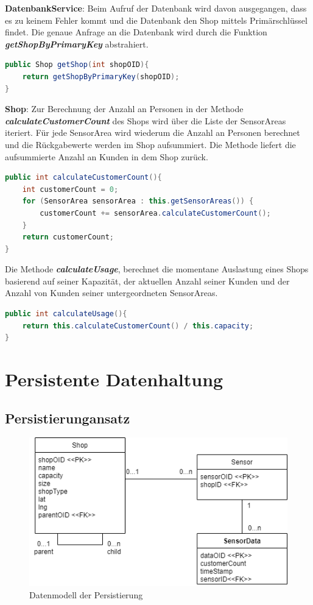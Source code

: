 \documentclass[runningheads]{llncs}
\begin{document}
\textbf{DatenbankService}: Beim Aufruf der Datenbank wird davon ausgegangen, dass es zu keinem Fehler kommt und die Datenbank den Shop mittels Primärschlüssel findet.
Die genaue Anfrage an die Datenbank wird durch die Funktion \textbf{\textit{getShopByPrimaryKey}} abstrahiert.
\begin{lstlisting}[language=Java, basicstyle=\scriptsize]
public Shop getShop(int shopOID){
	return getShopByPrimaryKey(shopOID);
}
\end{lstlisting}

\break
\textbf{Shop}: Zur Berechnung der Anzahl an Personen in der Methode \textbf{\textit{calculateCustomerCount}} des Shops wird über die Liste der SensorAreas iteriert.
Für jede SensorArea wird wiederum die Anzahl an Personen berechnet und die Rückgabewerte werden im Shop aufsummiert.
Die Methode liefert die aufsummierte Anzahl an Kunden in dem Shop zurück.
\begin{lstlisting}[language=Java, basicstyle=\scriptsize]
public int calculateCustomerCount(){
	int customerCount = 0;
	for (SensorArea sensorArea : this.getSensorAreas()) {
		customerCount += sensorArea.calculateCustomerCount();
	}
	return customerCount;
}
\end{lstlisting}

Die Methode \textbf{\textit{calculateUsage}}, berechnet die momentane Auslastung eines Shops basierend auf seiner Kapazität, der aktuellen Anzahl seiner Kunden und der Anzahl von Kunden seiner untergeordneten SensorAreas.
\begin{lstlisting}[language=Java, basicstyle=\scriptsize]
public int calculateUsage(){
	return this.calculateCustomerCount() / this.capacity;
}
\end{lstlisting}

\newpage
\section{Persistente Datenhaltung}

\subsection{Persistierungansatz}

\begin{figure}
\includegraphics[width=\linewidth]{images/Datamodel}
\caption{Datenmodell der Persistierung}
\end{figure}
\end{document}
